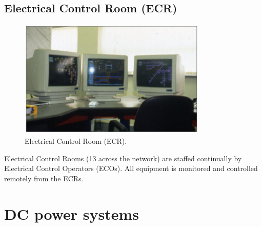 \subsection{Electrical Control Room (ECR)}
\begin{figure}[H]
    \centering
    \includegraphics[width = 0.8\textwidth]{img/figure121.png}
    \caption{Electrical Control Room (ECR).}
\end{figure}
Electrical Control Rooms (13 across the network) are staffed continually by Electrical Control Operators (ECOs). All equipment is monitored and controlled remotely from the ECRs.
\section{DC power systems}
